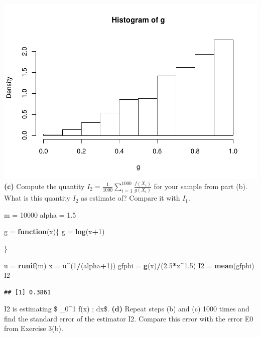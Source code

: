 \documentclass[
]{article}
\newenvironment{Shaded}{\begin{snugshade}}{\end{snugshade}}
\newcommand{\ControlFlowTok}[1]{\textcolor[rgb]{0.13,0.29,0.53}{\textbf{#1}}}
\newcommand{\DecValTok}[1]{\textcolor[rgb]{0.00,0.00,0.81}{#1}}
\newcommand{\FloatTok}[1]{\textcolor[rgb]{0.00,0.00,0.81}{#1}}
\newcommand{\KeywordTok}[1]{\textcolor[rgb]{0.13,0.29,0.53}{\textbf{#1}}}
\newcommand{\NormalTok}[1]{#1}
\newcommand{\OperatorTok}[1]{\textcolor[rgb]{0.81,0.36,0.00}{\textbf{#1}}}
\newcommand{\StringTok}[1]{\textcolor[rgb]{0.31,0.60,0.02}{#1}}
\begin{document}
\includegraphics{hw03_yutingd3_files/figure-latex/unnamed-chunk-9-1.pdf}
\textbf{(c)} Compute the quantity
\(I_2 = \frac{1}{1000} \sum_{i=1}^{1000} \frac{f(X_i)}{g(X_i)}\) for
your sample from part (b). What is this quantity \(I_2\) as estimate of?
Compare it with \(I_1\).

\begin{Shaded}
\begin{Highlighting}[]
\NormalTok{m =}\StringTok{ }\DecValTok{10000}
\NormalTok{alpha =}\StringTok{ }\FloatTok{1.5}

\NormalTok{g =}\StringTok{ }\ControlFlowTok{function}\NormalTok{(x)\{}
\NormalTok{  g =}\StringTok{ }\KeywordTok{log}\NormalTok{(x}\OperatorTok{+}\DecValTok{1}\NormalTok{)}

\NormalTok{\}}

\NormalTok{u =}\StringTok{ }\KeywordTok{runif}\NormalTok{(m)}
\NormalTok{x =}\StringTok{ }\NormalTok{u}\OperatorTok{^}\NormalTok{(}\DecValTok{1}\OperatorTok{/}\NormalTok{(alpha}\OperatorTok{+}\DecValTok{1}\NormalTok{))}
\NormalTok{gfphi =}\StringTok{ }\KeywordTok{g}\NormalTok{(x)}\OperatorTok{/}\NormalTok{(}\FloatTok{2.5}\OperatorTok{*}\NormalTok{x}\OperatorTok{^}\FloatTok{1.5}\NormalTok{)}
\NormalTok{I2 =}\StringTok{ }\KeywordTok{mean}\NormalTok{(gfphi)}
\NormalTok{I2}
\end{Highlighting}
\end{Shaded}

\begin{verbatim}
## [1] 0.3861
\end{verbatim}

I2 is estimating \$ \int\_0\^{}1 f(x) ; dx\$. \textbf{(d)} Repeat steps
(b) and (c) 1000 times and find the standard error of the estimator I2.
Compare this error with the error E0 from Exercise 3(b).
\end{document}
